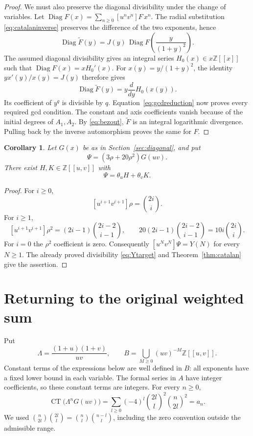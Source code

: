 \documentclass[11pt,a4paper]{article}
\newtheorem{corollary}[theorem]{Corollary}
\theoremstyle{remark}\newtheorem{remark}[theorem]{Remark}
\newcommand{\Z}{\mathbb Z}\newcommand{\Q}{\mathbb Q}
\newcommand{\CT}{\operatorname{CT}}
\newcommand{\Diag}{\operatorname{Diag}}
\begin{document}
\begin{proof}
We must also preserve the diagonal divisibility under the change of
variables. Let \(\Diag F(x)=\sum_{n\ge0}[u^nv^n]F\,x^n\).
The radial substitution \eqref{eq:catalaninverse} preserves the
difference of the two exponents, hence
\[
 \Diag\widetilde F(y)=J(y)\,\Diag F\left(\frac{y}{(1+y)^2}\right).
\]
The assumed diagonal divisibility gives an integral series
\(H_0(x)\in x\Z[[x]]\) such that \(\Diag F(x)=xH_0'(x)\).
For \(x(y)=y/(1+y)^2\), the identity
\(yx'(y)/x(y)=J(y)\) therefore gives
\[
              \Diag\widetilde F(y)
                       =y\frac{d}{dy}H_0(x(y)).
\]
Its coefficient of \(y^q\) is divisible by \(q\).
Equation~\eqref{eq:gcdreduction} now proves every required gcd
condition. The constant and axis coefficients vanish because of the
initial degrees of \(A_1,A_2\). By \eqref{eq:bezout}, \(\widetilde F\)
is an integral logarithmic divergence. Pulling back by the inverse
automorphism proves the same for \(F\).
\end{proof}

\begin{corollary}\label{cor:Psi}
Let \(G(x)\) be as in Section~\ref{sec:diagonal}, and put
\[
                       \Psi=(3\rho+20\rho^2)G(uv).
\]
There exist \(H,K\in\Z[[u,v]]\) with
\[
                            \Psi=\theta_uH+\theta_vK.
\]
\end{corollary}
\begin{proof}
For \(i\ge0\),
\[
 [u^{i+1}v^{i+1}]\rho=\binom{2i}{i}.
\]
For \(i\ge1\),
\[
 [u^{i+1}v^{i+1}]\rho^2
       =(2i-1)\binom{2i-2}{i-1},\qquad
 20(2i-1)\binom{2i-2}{i-1}=10i\binom{2i}{i}.
\]
For \(i=0\) the \(\rho^2\) coefficient is zero. Consequently
\([u^Nv^N]\Psi=Y(N)\) for every \(N\ge1\).
The already proved divisibility \eqref{eq:Ytarget} and
Theorem~\ref{thm:catalan} give the assertion.
\end{proof}

\section{Returning to the original weighted sum}\label{sec:return}

Put
\[
 \Lambda=\frac{(1+u)(1+v)}{uv},\qquad
 B=\bigcup_{M\ge0}(uv)^{-M}\Z[[u,v]].
\]
Constant terms of the expressions below are well defined in \(B\):
all exponents have a fixed lower bound in each variable. The formal
series in \(A\) have integer coefficients, so these constant terms
are integers. For every \(n\ge0\),
\begin{equation}\label{eq:ct-original}
 \CT\bigl(\Lambda^nG(uv)\bigr)
    =\sum_{l\ge0}(-4)^l\binom{2l}{l}^2\binom{n}{2l}^2
    =a_n.
\end{equation}
We used \(\binom{n}{2l}\binom{2l}{l}
=\binom nl\binom{n-l}{l}\), including the zero convention outside
the admissible range.
\end{document}
